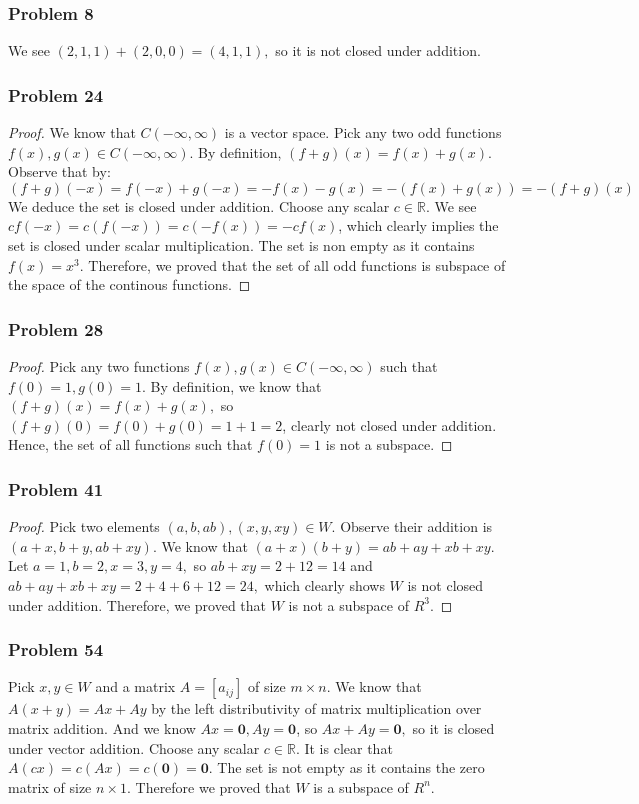 \documentclass[a4paper,12pt]{article}
\begin{document}
\subsubsection*{Problem 8}
We see $(2,1,1)+(2,0,0)=(4,1,1),$ so it is not closed under addition.
\subsubsection*{Problem 24}
\begin{proof}
    We know that $C(-\infty, \infty)$ is a vector space. Pick any two odd functions $f(x),g(x) \in C(-\infty, \infty)$. By definition, $(f+g)(x)=f(x)+g(x)$. Observe that by: \[(f+g)(-x)=f(-x)+g(-x)=-f(x)-g(x)=-(f(x)+g(x))=-(f+g)(x)\] We deduce the set is closed under addition.
    Choose any scalar $c \in \mathbb{R}$. We see $cf(-x)=c(f(-x))=c(-f(x))=-cf(x)$, which clearly implies the set is closed under scalar multiplication. The set is non empty as it contains $f(x)=x^3.$ Therefore, we proved that the set of all odd functions is subspace of the space of the continous functions.
\end{proof}
\subsubsection*{Problem 28}
\begin{proof}
    Pick any two functions $f(x),g(x) \in C(-\infty, \infty)$ such that $f(0)=1, g(0)=1.$ By definition, we know that $(f+g)(x)=f(x)+g(x),$ so $(f+g)(0)=f(0)+g(0)=1+1=2$, clearly not closed under addition. Hence, the set of all functions such that $f(0)=1$ is not a subspace.
\end{proof}
\subsubsection*{Problem 41}
\begin{proof}
    Pick two elements $(a,b,ab),(x,y,xy)\in W.$ Observe their addition is $(a+x,b+y, ab+xy).$ We know that $(a+x)(b+y)=ab+ay+xb+xy.$ Let $a=1,b=2,x=3,y=4,$ so $ab+xy=2+12=14$ and $ab+ay+xb+xy=2+4+6+12=24,$ which clearly shows $W$ is not closed under addition. Therefore, we proved that $W$ is not a subspace of $R^3.$
\end{proof}
\subsubsection*{Problem 54}
Pick $x,y \in W$ and a matrix $A=[a_{ij}]$ of size $m \times n$. We know that $A(x+y) = Ax+Ay$ by the left distributivity of matrix multiplication over matrix addition. And we know $Ax=\textbf{0}, Ay=\textbf{0}$, so $Ax+Ay=\textbf{0},$ so it is closed under vector addition. Choose any scalar $c \in \mathbb{R}.$ It is clear that $A(cx)=c(Ax)=c(\textbf{0})=\textbf{0}.$ The set is not empty as it contains the zero matrix of size $n\times 1$. Therefore we proved that $W$ is a subspace of $R^n.$
\end{document}
